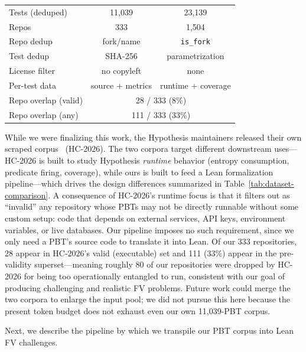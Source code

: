 \begin{table}[t]
\begin{minipage}[t]{0.62\textwidth}
\begin{tabular}{@{}l c c@{}}
    Tests (deduped)  & 11{,}039           & 23{,}139 \\
    Repos            & 333                & 1{,}504 \\
    Repo dedup       & fork/name          & \texttt{is\_fork} \\
    Test dedup       & SHA-256            & parametrization \\
    License filter   & no copyleft        & none \\
    Per-test data    & source + metrics   & runtime + coverage \\
    \midrule
    Repo overlap (valid)  & \multicolumn{2}{c}{28 / 333 \enskip(8\%)} \\
    Repo overlap (any)    & \multicolumn{2}{c}{111 / 333 \enskip(33\%)} \\
    \bottomrule
  \end{tabular}
\end{minipage}
\end{table}

While we were finalizing this work, the Hypothesis maintainers released their own scraped corpus~\cite{devoe2026hypothesis} (HC-2026).
The two corpora target different downstream uses---HC-2026 is built to study Hypothesis \emph{runtime} behavior (entropy consumption, predicate firing, coverage), while ours is built to feed a Lean formalization pipeline---which drives the design differences summarized in Table~\ref{tab:dataset-comparison}.
A consequence of HC-2026's runtime focus is that it filters out as ``invalid'' any repository whose PBTs may not be directly runnable without some custom setup: code that depends on external services, API keys, environment variables, or live databases. Our pipeline imposes no such requirement, since we only need a PBT's source code to translate it into Lean. Of our 333 repositories, 28 appear in HC-2026's valid (executable) set and 111 (33\%) appear in the pre-validity superset---meaning roughly 80 of our repositories were dropped by HC-2026 for being too operationally entangled to run, consistent with our goal of producing challenging and realistic FV problems.
Future work could merge the two corpora to enlarge the input pool; we did not pursue this here because the present token budget does not exhaust even our own 11{,}039-PBT corpus.

Next, we describe the pipeline by which we transpile our PBT corpus into Lean FV challenges.
